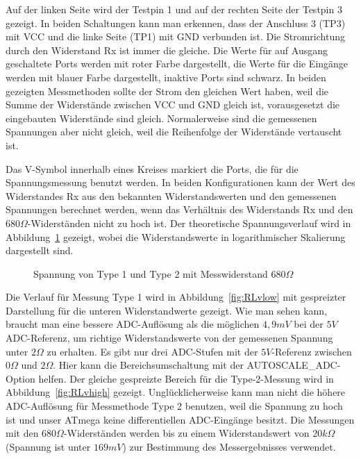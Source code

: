 Auf der linken Seite wird der Testpin 1 und auf der rechten Seite der Testpin 3 gezeigt.
In beiden Schaltungen kann man erkennen, dass der Anschluss 3 (TP3) mit VCC und die linke Seite (TP1) mit
GND verbunden ist.
Die Stromrichtung durch den Widerstand Rx ist immer die gleiche.
Die Werte für auf Ausgang geschaltete Ports werden mit roter Farbe dargestellt, 
die Werte für die Eingänge werden mit blauer Farbe dargestellt, inaktive Ports sind schwarz.
In beiden gezeigten Messmethoden sollte der Strom den gleichen Wert haben, weil die Summe der Widerstände zwischen
VCC und GND gleich ist, vorausgesetzt die eingebauten Widerstände sind gleich.
Normalerweise sind die gemessenen Spannungen aber nicht gleich, weil die Reihenfolge
der Widerstände vertauscht ist.

Das V-Symbol innerhalb eines Kreises markiert die Ports, die für die Spannungsmessung benutzt werden.
In beiden Konfigurationen kann der Wert des Widerstandes Rx aus den bekannten Widerstandswerten
und den gemessenen Spannungen berechnet werden, wenn das Verhältnis des Widerstands Rx und den \(680\Omega\)-Widerständen
 nicht zu hoch ist.
Der theoretische Spannungsverlauf wird in Abbildung~\ref{fig:RLvtot} gezeigt, wobei die Widerstandswerte 
in logarithmischer Skalierung dargestellt sind.
\begin{figure}[H]
\centering

\caption{Spannung von Type 1 und Type 2 mit Messwiderstand \(680\Omega\) }
\label{fig:RLvtot}
\end{figure}
Die Verlauf für Messung Type 1 wird in Abbildung~\ref{fig:RLvlow} mit gespreizter Darstellung für die unteren Widerstandwerte gezeigt.
Wie man sehen kann, braucht man eine bessere ADC-Auflösung als die möglichen \(4,9mV\) bei der \(5V\) ADC-Referenz, um richtige
Widerstandswerte von der gemessenen Spannung unter \(2\Omega\) zu erhalten.
Es gibt nur drei ADC-Stufen mit der \(5V\)-Referenz zwischen \(0\Omega\) und \(2\Omega\).
Hier kann die Bereichsumschaltung mit der AUTOSCALE\_ADC-Option helfen.
Der gleiche gespreizte Bereich für die Type-2-Messung wird in Abbildung~\ref{fig:RLvhigh} gezeigt.
Unglücklicherweise kann man nicht die höhere ADC-Auflösung für Messmethode Type 2 benutzen,
weil die Spannung zu hoch ist und unser ATmega keine differentiellen ADC-Eingänge besitzt.
Die Messungen mit den \(680\Omega\)-Widerständen werden bis zu einem Widerstandswert von 
\(20k\Omega\) (Spannung ist unter \(169mV\)) zur Bestimmung des Messergebnisses verwendet.

